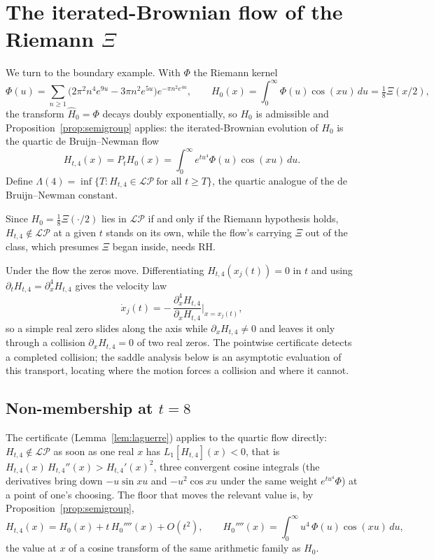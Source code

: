 \documentclass[11pt,reqno]{amsart}
\theoremstyle{plain}
\theoremstyle{definition}
\theoremstyle{remark}
\newcommand{\LP}{\mathcal{LP}}
\begin{document}
\section{The iterated-Brownian flow of the Riemann \texorpdfstring{$\Xi$}{Xi}}
\label{sec:zeta}

We turn to the boundary example. With $\Phi$ the Riemann kernel
\[
   \Phi(u)=\sum_{n\ge1}\bigl(2\pi^2n^4e^{9u}-3\pi n^2e^{5u}\bigr)e^{-\pi
   n^2e^{4u}},\qquad
   H_0(x)=\int_0^\infty\Phi(u)\cos(xu)\,du=\tfrac18\Xi(x/2),
\]
the transform $\hat H_0=\Phi$ decays doubly exponentially, so $H_0$ is
admissible and Proposition~\ref{prop:semigroup} applies: the
iterated-Brownian evolution of $H_0$ is the quartic de Bruijn--Newman flow
\[
   H_{t,4}(x)=P_tH_0(x)=\int_0^\infty e^{tu^4}\Phi(u)\cos(xu)\,du .
\]
Define $\Lambda(4)=\inf\{T:H_{t,4}\in\LP\ \text{for all }t\ge T\}$, the quartic
analogue of the de Bruijn--Newman constant.

Since $H_0=\tfrac18\Xi(\cdot/2)$ lies in $\LP$ if and only if the Riemann
hypothesis holds, $H_{t,4}\notin\LP$ at a given $t$ stands on its own, while the
flow's carrying $\Xi$ out of the class, which presumes $\Xi$ began
inside, needs RH.

Under the flow the zeros move. Differentiating $H_{t,4}(x_j(t))=0$ in $t$ and
using $\partial_tH_{t,4}=\partial_x^4H_{t,4}$ gives the velocity law
\[
   \dot x_j(t)=-\,\frac{\partial_x^4H_{t,4}}{\partial_xH_{t,4}}\bigg|_{x=x_j(t)},
\]
so a simple real zero slides along the axis while $\partial_xH_{t,4}\neq0$ and
leaves it only through a collision $\partial_xH_{t,4}=0$ of two real zeros. The
pointwise certificate detects a completed collision; the saddle analysis below is
an asymptotic evaluation of this transport, locating where the motion forces a
collision and where it cannot.

\subsection{Non-membership at \texorpdfstring{$t=8$}{t=8}}
The certificate (Lemma~\ref{lem:laguerre}) applies to the quartic flow directly:
$H_{t,4}\notin\LP$ as soon as one real $x$ has $L_1[H_{t,4}](x)<0$, that is
$H_{t,4}(x)\,H_{t,4}''(x)>H_{t,4}'(x)^2$, three convergent cosine integrals (the
derivatives bring down $-u\sin xu$ and $-u^2\cos xu$ under the same weight
$e^{tu^4}\Phi$) at a point of one's choosing. The floor that moves the relevant
value is, by Proposition~\ref{prop:semigroup},
\begin{equation}\label{eq:floor4}
   H_{t,4}(x)=H_0(x)+t\,H_0''''(x)+O(t^2),\qquad
   H_0''''(x)=\int_0^\infty u^4\,\Phi(u)\cos(xu)\,du,
\end{equation}
the value at $x$ of a cosine transform of the same arithmetic family as $H_0$.
\end{document}
